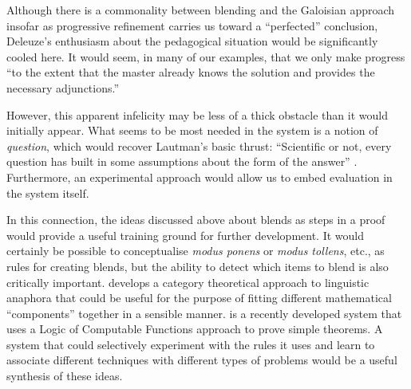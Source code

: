 Although there is a commonality between blending and the
Galoisian approach insofar as progressive refinement carries us toward a
``perfected'' conclusion, Deleuze's enthusiasm about the pedagogical
situation would be significantly cooled here.  It would seem, in many
of our examples, that we only make progress ``to the extent that the
master already knows the solution and provides the necessary
adjunctions.''

However, this apparent infelicity may be less of a thick obstacle than
it would initially appear.  What seems to be most needed in the system
is a notion of \emph{question}, which would recover Lautman's basic
thrust: ``Scientific or not, every question has built in some
assumptions about the form of the answer'' \cite{larvor2011albert}.
Furthermore, an experimental approach would allow us to embed
evaluation in the system itself.  

In this connection, the ideas discussed above about blends as steps in
a proof would provide a useful training ground for further
development.  It would certainly be possible to conceptualise
\emph{modus ponens} or \emph{modus tollens}, etc., as rules for
creating blends, but the ability to detect which items to blend is
also critically important.  \cite{AbrSad14} develops a category
theoretical approach to linguistic anaphora that could be useful for
the purpose of fitting different mathematical ``components'' together
in a sensible manner.  \cite{DBLP:journals/corr/GanesalingamG13} is a
recently developed system that uses a Logic of Computable Functions
approach to prove simple theorems.  A system that could selectively
experiment with the rules it uses and learn to associate different
techniques with different types of problems would be a useful
synthesis of these ideas.

